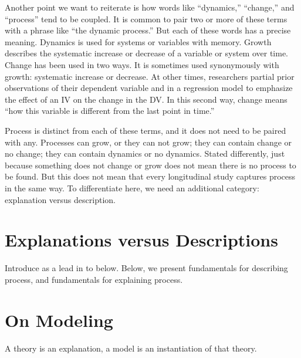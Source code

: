 \documentclass[english,,man]{apa6}
\theoremstyle{definition}
\theoremstyle{definition}
\theoremstyle{definition}
\theoremstyle{remark}
\begin{document}
Another point we want to reiterate is how words like \enquote{dynamics,}
\enquote{change,} and \enquote{process} tend to be coupled. It is common
to pair two or more of these terms with a phrase like \enquote{the
dynamic process.} But each of these words has a precise meaning.
Dynamics is used for systems or variables with memory. Growth describes
the systematic increase or decrease of a variable or system over time.
Change has been used in two ways. It is sometimes used synonymously with
growth: systematic increase or decrease. At other times, researchers
partial prior observations of their dependent variable and in a
regression model to emphasize the effect of an IV on the change in the
DV. In this second way, change means \enquote{how this variable is
different from the last point in time.}

Process is distinct from each of these terms, and it does not need to be
paired with any. Processes can grow, or they can not grow; they can
contain change or no change; they can contain dynamics or no dynamics.
Stated differently, just because something does not change or grow does
not mean there is no process to be found. But this does not mean that
every longitudinal study captures process in the same way. To
differentiate here, we need an additional category: explanation versus
description.

\hypertarget{explanations-versus-descriptions}{%
\section{Explanations versus
Descriptions}\label{explanations-versus-descriptions}}

Introduce as a lead in to below. Below, we present fundamentals for
describing process, and fundamentals for explaining process.

\hypertarget{on-modeling}{%
\section{On Modeling}\label{on-modeling}}

A theory is an explanation, a model is an instantiation of that theory.
\end{document}

